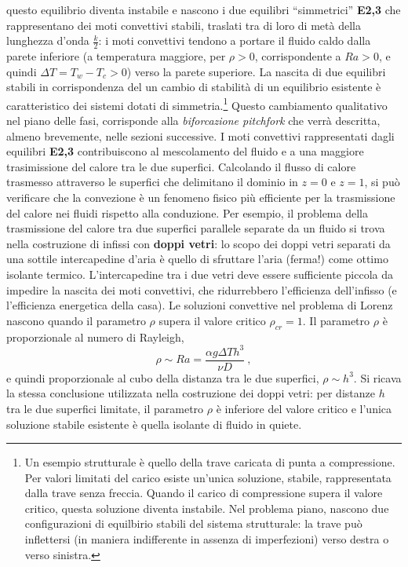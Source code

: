  questo equilibrio diventa instabile e nascono i due equilibri ``simmetrici''
 \textbf{E2,3} che rappresentano dei moti convettivi stabili, traslati tra di loro
 di metà della lunghezza d'onda $\frac{k}{2}$: i moti convettivi tendono a portare il
 fluido caldo dalla parete inferiore (a temperatura maggiore, per $\rho>0$, corrispondente
 a $Ra > 0$, e quindi $\Delta T = T_w - T_c >0$) verso la parete superiore.
 La nascita di due equilibri stabili
 in corrispondenza del un cambio di stabilità di un equilibrio esistente è
 caratteristico dei sistemi dotati di simmetria.\footnote{
Un esempio strutturale è quello della trave caricata di punta a compressione. Per
 valori limitati del carico esiste un'unica soluzione, stabile, rappresentata dalla
 trave senza freccia. Quando il carico di compressione supera il valore critico,
 questa soluzione diventa instabile. Nel problema piano, nascono due configurazioni
 di equilbirio stabili del sistema strutturale: la trave può inflettersi 
 (in maniera indifferente in assenza di imperfezioni) verso destra o verso sinistra.
} Questo cambiamento qualitativo nel piano delle fasi, corrisponde alla
 \textit{biforcazione pitchfork} che verrà descritta, almeno brevemente, nelle
 sezioni successive.
\newline
I moti convettivi rappresentati dagli equilibri \textbf{E2,3} contribuiscono al mescolamento
 del fluido e a una maggiore trasimissione del calore tra le due superfici.
Calcolando il flusso di calore trasmesso attraverso le superfici che delimitano
 il dominio in $z=0$ e $z=1$, si può verificare che la convezione è un fenomeno fisico
 più efficiente per la trasmissione del calore nei fluidi rispetto alla conduzione.
 Per esempio, il problema della trasmissione del calore tra due superfici parallele
 separate da un fluido si trova nella costruzione di infissi con \textbf{doppi vetri}:
 lo scopo dei doppi vetri separati da una sottile intercapedine d'aria è quello di
 sfruttare l'aria (ferma!) come ottimo isolante termico. L'intercapedine tra i due
 vetri deve essere sufficiente piccola da impedire la nascita dei moti convettivi,
 che ridurrebbero l'efficienza dell'infisso (e l'efficienza energetica della casa).
Le soluzioni convettive nel problema di Lorenz nascono quando il parametro $\rho$ 
 supera il valore critico $\rho_{cr} = 1$. Il parametro $\rho$ è proporzionale 
 al numero di Rayleigh,
\begin{equation}
 \rho \sim Ra = \frac{\alpha g \Delta T h^3}{\nu D} \ ,
\end{equation}
e quindi proporzionale al cubo della distanza tra le due superfici, $\rho \sim h^3$.
 Si ricava la stessa conclusione utilizzata nella costruzione dei doppi vetri: per
 distanze $h$ tra le due superfici limitate, il parametro $\rho$ è inferiore del
 valore critico e l'unica soluzione stabile esistente è quella isolante di fluido
 in quiete.

